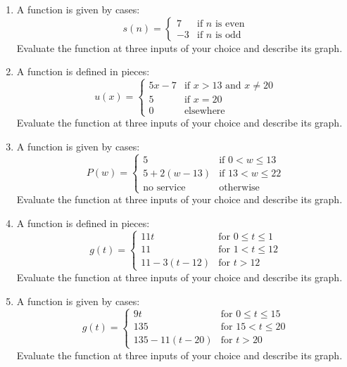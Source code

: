 \documentclass[11pt]{article}
\begin{document}
\begin{enumerate}
\label{eq060}\[
  s(n) = \begin{cases} 5 & \text{if } n \text{ is even} \\ -11 & \text{if } n \text{ is odd} \end{cases}
\]
Evaluate the function at three inputs of your choice and describe its graph.
\item A function is given by cases:
\label{eq061}\[
  s(n) = \begin{cases} 7 & \text{if } n \text{ is even} \\ -3 & \text{if } n \text{ is odd} \end{cases}
\]
Evaluate the function at three inputs of your choice and describe its graph.
\item A function is defined in pieces:
\label{eq062}\[
  u(x) = \begin{cases} 5x - 7 & \text{if } x > 13 \text{ and } x \ne 20 \\ 5 & \text{if } x = 20 \\ 0 & \text{elsewhere} \end{cases}
\]
Evaluate the function at three inputs of your choice and describe its graph.
\item A function is given by cases:
\label{eq063}\[
  P(w) = \begin{cases} 5 & \text{if } 0 < w \le 13 \\ 5 + 2(w - 13) & \text{if } 13 < w \le 22 \\ \text{no service} & \text{otherwise} \end{cases}
\]
Evaluate the function at three inputs of your choice and describe its graph.
\item A function is defined in pieces:
\label{eq064}\[
  g(t) = \begin{cases} 11t & \text{for } 0 \le t \le 1 \\ 11 & \text{for } 1 < t \le 12 \\ 11 - 3(t - 12) & \text{for } t > 12 \end{cases}
\]
Evaluate the function at three inputs of your choice and describe its graph.
\item A function is given by cases:
\label{eq065}\[
  g(t) = \begin{cases} 9t & \text{for } 0 \le t \le 15 \\ 135 & \text{for } 15 < t \le 20 \\ 135 - 11(t - 20) & \text{for } t > 20 \end{cases}
\]
Evaluate the function at three inputs of your choice and describe its graph.
\end{enumerate}
\end{document}
